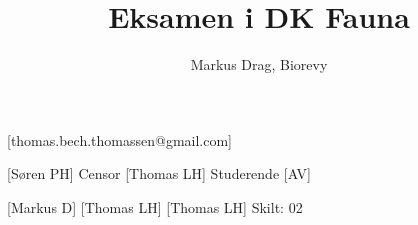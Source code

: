 \documentclass[a4paper,12pt]{article}
\title{Eksamen i DK Fauna}
\author{Markus Drag, Biorevy}
\begin{document}
\maketitle

\begin{texxers}
	[thomas.bech.thomassen@gmail.com]
\end{texxers}

\begin{roles}
	[Søren PH] Censor
	[Thomas LH] Studerende
	[AV]
\end{roles}


\begin{props}
	[Markus D] 
	[Thomas LH]
	[Thomas LH] Skilt: 02
\end{props}
\end{document}
